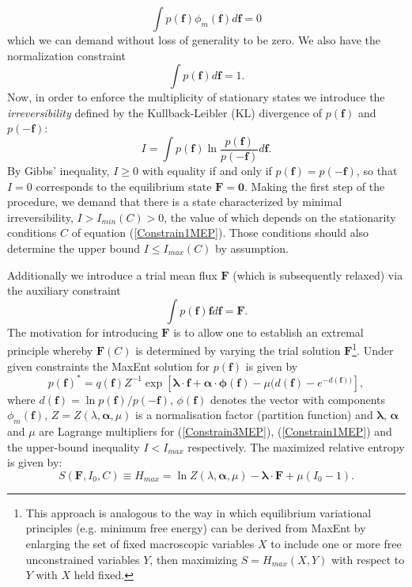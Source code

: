 \documentclass[a4paper,12pt]{article}
\begin{document}
\begin{equation}
\label{Constrain1MEP}
  \int p(\bm{f})\phi_m(\bm{f})d\bm{f} =0
\end{equation}
which we can demand without loss of generality to be zero.
We also have the normalization constraint
\begin{equation}
\label{Constrain2MEP}
  \int p(\bm{f})d\bm{f} = 1.
\end{equation}
Now, in order to enforce the multiplicity of stationary states we introduce the \textit{irreversibility} defined by the Kullback-Leibler (KL) divergence of $p(\bm{f})$ and $p(-\bm{f})$:
\begin{equation}
\label{IrreversibilityMeasure}
  I= \int p(\bm{f}) \ln \frac{p(\bm{f})}{p(-\bm{f})} d\bm{f}.
\end{equation}
By Gibbs' inequality, $I \geq 0$ with equality if and only if $p(\bm{f})=p(-\bm{f})$, so that $I=0$ corresponds to the equilibrium state $\bm{F} = \bm{0} $.
Making the first step of the procedure, we demand that there is a state characterized by minimal irreversibility, $I>I_{min}(C)>0$, the value of which depends on the stationarity conditions $C$ of equation (\ref{Constrain1MEP}).
Those conditions should also determine the upper bound $I \leq I_{max}(C)$ by assumption.

Additionally we introduce a trial mean flux $\bm{F}$ (which is subsequently relaxed) via the auxiliary constraint
\begin{equation}
\label{Constrain3MEP}
  \int p(\bm{f})\bm{f} d\bm{f} = \bm{F}.
\end{equation}
The motivation for introducing $\bm{F}$ is to allow one to establish an extremal principle whereby $\bm{F}(C)$ is determined by varying the trial solution $\bm{F}$\footnote{This approach is analogous to the way in which equilibrium variational principles (e.g. minimum free energy) can be derived from MaxEnt by enlarging the set of fixed macroscopic variables $X$ to include one or more free unconstrained variables $Y$, then maximizing $S=H_{max}(X,Y)$ with respect to $Y$ with $X$ held fixed.}.
Under given constraints the MaxEnt solution for $p(\bm{f})$ is given by 
\begin{equation}
\label{MaxEntPDF1}
  p(\bm{f})^* = q( \bm{f} ) Z^{-1} \exp[\bm{\lambda} \cdot \bm{f}+ \bm{\alpha} \cdot \bm{\phi} (\bm{f}) - \mu ( d(\bm{f}) - e^{-d(\bm{f}))}],
\end{equation}
where $d(\bm{f})= \ln{p(\bm{f})/p(-\bm{f})}$, $\phi(\bm{f})$ denotes the vector with components $\phi_m(\bm{f})$, $Z = Z(\lambda, \bm{\alpha},\mu)$ is a normalisation factor (partition function) and $\bm{\lambda}$, $\bm{\alpha}$ and $\mu$ are Lagrange multipliers for (\ref{Constrain3MEP}), (\ref{Constrain1MEP}) and the upper-bound inequality $I<I_{max}$ respectively. The maximized relative entropy is given by:
\begin{equation}
  S(\bm{F}, I_0, C) \equiv H_{max} = \ln Z(\lambda, \bm{\alpha}, \mu) - \bm{\lambda} \cdot \bm{F} + \mu(I_0 -1).
\end{equation}
\end{document}
